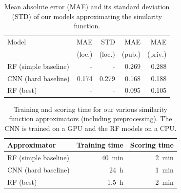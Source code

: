 \documentclass[10pt,conference,compsocconf]{IEEEtran}
\begin{document}
\begin{table}\centering
    \begin{tabular}{lrr|rr}
    \toprule
        Model           & MAE           & STD           &  MAE          &  MAE \\
                        & (loc.)        & (loc.)        & (pub.)        & (priv.) \\
    \midrule
        RF (simple baseline)   & -             & -             & \SI{0.269}{}  & \SI{0.288}{} \\
        CNN (hard baseline)    & \SI{0.174}{}  & \SI{0.279}{}  & \SI{0.168}{}  & \SI{0.188}{} \\
        RF (best)       & -             & -             & \SI{0.095}{}  & \SI{0.105}{} \\
    \bottomrule
    \end{tabular}
    \caption{Mean absolute error (MAE) and its standard deviation (STD) of our models approximating the similarity function.}
\label{tab:SFA_MSS}
\end{table}

\begin{table}\centering
    \begin{tabular}{lrr}
    \toprule
        Approximator    & Training time     & Scoring time \\
    \midrule
        RF (simple baseline)   & \SI{40}{\minute}  & \SI{2}{\minute} \\
        CNN (hard baseline)             & \SI{24}{\hour}    & \SI{1}{\minute} \\
        RF (best)       & \SI{1.5}{\hour}   & \SI{2}{\minute} \\
    \bottomrule
    \end{tabular}
\caption{Training and scoring time for our various similarity function approximators (including preprocessing). The CNN is trained on a GPU and the RF models on a CPU.}\label{tab:SFA_time}
\end{table}
\end{document}
